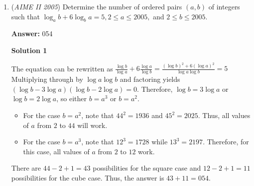 \begin{enumerate}
 So now we have $121 + 64 + 276 - 8 -8 -11$ potential divisors.  However, we've now undercounted those factors which divide all three of our numbers.  Luckily, we see that the only such factor is 1, so we must add 1 to our previous sum to get an answer of $121 + 64 + 276 - 8 - 8 - 11 + 1 = \boxed{435}$.

 



\textbf{Solution 2}

We can rewrite the three numbers as $10^{10} = 2^{10}\cdot 5^{10}$, $15^7 = 3^7\cdot5^7$, and $18^{11} = 2^{11}\cdot3^{22}$.Assume that $n$ (a positive integer) is a divisor of one of the numbers. Therefore, $n$ can be expressed as ${p_1}^{e_1}$ or as ${p_2}^{e_2}{p_3}^{e_3}$ where $p_1$, $p_2$ are in $\{2,3,5\}$ and $e_1$, $e_2$ are positive integers.

 If $n$ is the power of a single prime, then there are 11 possibilities ($2^1$ to $2^{11}$) for $p_1=2$, 22 possibilities ($3^1$ to $3^{22}$) for $p_1=3$, 10 possibilities ($5^1$ to $5^{10}$) for $p_1=5$, and 1 possibility if $n=1$. From this case, there are $11+22+10+1=44$ possibilities.

 If $n$ is the product of the powers of two primes, then we can just multiply the exponents of each rewritten product to get the number of possibilities, since each exponent of the product must be greater than 0. From this case, there are $10*10+11*22+7*7=100+242+49=391$ possibilities.

 Adding up the two cases, there are $44+391=\boxed{435}$ positive integers.

 -alpha\_2

 


	\item (\textit{AIME II 2005}) Determine the number of ordered pairs $(a,b)$ of integers such that $\log_a b + 6\log_b a=5, 2 \leq a \leq 2005,$ and $2 \leq b \leq 2005.$

 \textbf{Answer: }054



\textbf{Solution 1}

The equation can be rewritten as $\frac{\log b}{\log a} + 6 \frac{\log a}{\log b} = \frac{(\log b)^2+6(\log a)^2}{\log a  \log b}=5$ Multiplying through by $\log a \log b$ and factoring yields $(\log b - 3\log a)(\log b - 2\log a)=0$. Therefore, $\log b=3\log a$ or $\log b=2\log a$, so either $b=a^3$ or $b=a^2$. 

 
            \begin{itemize}
        \item For the case $b=a^2$, note that $44^2=1936$ and $45^2=2025$. Thus, all values of $a$ from $2$ to $44$ will work.
        \item For the case $b=a^3$, note that $12^3=1728$ while $13^3=2197$. Therefore, for this case, all values of $a$ from $2$ to $12$ work.
            \end{itemize}
            There are $44-2+1=43$ possibilities for the square case and $12-2+1=11$ possibilities for the cube case. Thus, the answer is $43+11= \boxed{054}$.


\end{enumerate}
